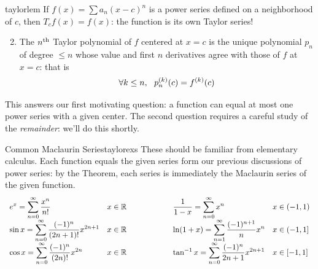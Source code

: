 \begin{thm}{}{taylorlem}
	\exstart If $f(x)=\sum a_n(x-c)^n$ is a power series defined on a neighborhood of $c$, then $T_cf(x)=f(x)$: the function is its own Taylor series!
	\begin{enumerate}\setcounter{enumi}{1}
		\item The $n\textsuperscript{th}$ Taylor polynomial of $f$ centered at $x=c$ is the unique polynomial $p_n$ of degree $\le n$ whose value and first $n$ derivatives agree with those of $f$ at $x=c$: that is
		\[
			\forall k\le n,\ \ \smash[t]{p_n^{(k)}(c)=f^{(k)}(c)}
		\]
	\end{enumerate}
\end{thm}

This answers our first motivating question: a function can equal at most one power series with a given center. The second question requires a careful study of the \emph{remainder}: we'll do this shortly.

\begin{examples}{Common Maclaurin Series}{taylorexs}
	These should be familiar from elementary calculus. Each function equals the given series form our previous discussions of power series: by the Theorem, each series is immediately the Maclaurin series of the given function.
	\[
		\def\arraystretch{2}
		\begin{array}{ll@{\qquad\qquad\qquad}ll}
			\displaystyle e^x=\sum_{n=0}^\infty\frac{x^n}{n!} & x\in\R
			&\displaystyle\frac 1{1-x}=\sum_{n=0}^\infty x^n & x\in(-1,1)\\
			\displaystyle\sin x=\sum_{n=0}^\infty\frac{(-1)^n}{(2n+1)!}x^{2n+1} & x\in\R
			&\displaystyle\ln(1+x)=\sum_{n=1}^\infty \frac{(-1)^{n+1}}nx^n & x\in (-1,1]\\
			\displaystyle\cos x=\sum_{n=0}^\infty\frac{(-1)^n}{(2n)!}x^{2n} & x\in\R
			&\displaystyle\tan^{-1}x=\sum_{n=0}^\infty \frac{(-1)^n}{2n+1}x^{2n+1} & x\in[-1,1]
		\end{array}
	\]
\end{examples}


\goodbreak


